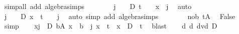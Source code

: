 \begin{isabellebody}
\ {\isacharparenleft}{\kern0pt}simp{\isacharunderscore}{\kern0pt}all\ add{\isacharcolon}{\kern0pt}\ algebra{\isacharunderscore}{\kern0pt}simps{\isacharparenright}{\kern0pt}\isanewline
\ \ \ \ \ \ \isamarkupfalse%
\ {\isachardoublequoteopen}{\isasymexists}j\ {\isasymin}\ {\isacharbraceleft}{\kern0pt}{}\ {\isachardot}{\kern0pt}{\isachardot}{\kern0pt}\ D{\isacharbraceright}{\kern0pt}{\isachardot}{\kern0pt}\ {\isacharparenleft}{\kern0pt}t\ {\isacharplus}{\kern0pt}\ {}{\isacharparenright}{\kern0pt}\ {\isacharminus}{\kern0pt}\ x\ {\isacharequal}{\kern0pt}\ j{\isachardoublequoteclose}\ \isamarkupfalse%
\ auto\isanewline
\ \ \ \ \ \ \isamarkupfalse%
\ {\isachardoublequoteopen}{\isasymexists}j\ {\isasymin}\ {\isacharbraceleft}{\kern0pt}{}\ {\isachardot}{\kern0pt}{\isachardot}{\kern0pt}\ D{\isacharbraceright}{\kern0pt}{\isachardot}{\kern0pt}\ x\ {\isacharequal}{\kern0pt}\ {\isacharparenleft}{\kern0pt}t\ {\isacharplus}{\kern0pt}\ {}{\isacharparenright}{\kern0pt}\ {\isacharminus}{\kern0pt}\ j{\isachardoublequoteclose}\ \isamarkupfalse%
\ {\isacharparenleft}{\kern0pt}auto\ simp\ add{\isacharcolon}{\kern0pt}\ algebra{\isacharunderscore}{\kern0pt}simps{\isacharparenright}{\kern0pt}\isanewline
\ \ \ \ \ \ \isamarkupfalse%
\ nob\ tA\ \isamarkupfalse%
\ {\isachardoublequoteopen}False{\isachardoublequoteclose}\ \isamarkupfalse%
\ simp\isacommand{{\isacharbraceright}{\kern0pt}}\isamarkupfalse%
\isanewline
\ \ \isamarkupfalse%
\ {\isachardoublequoteopen}{\isasymforall}x{\isachardot}{\kern0pt}{\isacharparenleft}{\kern0pt}{\isasymforall}j{\isasymin}{\isacharbraceleft}{\kern0pt}{}\ {\isachardot}{\kern0pt}{\isachardot}{\kern0pt}\ D{\isacharbraceright}{\kern0pt}{\isachardot}{\kern0pt}\ {\isasymforall}b{\isasymin}A{\isachardot}{\kern0pt}\ x\ {\isasymnoteq}\ b\ {\isacharminus}{\kern0pt}\ j{\isacharparenright}{\kern0pt}{\isasymlongrightarrow}\ {\isacharparenleft}{\kern0pt}x\ {\isasymle}\ t{\isacharparenright}{\kern0pt}\ {\isasymlongrightarrow}\ {\isacharparenleft}{\kern0pt}x\ {\isacharplus}{\kern0pt}\ D\ {\isasymle}\ t{\isacharparenright}{\kern0pt}{\isachardoublequoteclose}\ \isamarkupfalse%
\ blast\isanewline
{}\isamarkupfalse%
\isanewline
\ \ \isamarkupfalse%
\ d{\isacharcolon}{\kern0pt}\ {\isachardoublequoteopen}d\ dvd\ D{\isachardoublequoteclose}\isanewline
\ \ \isacommand{{\isacharbraceleft}{\kern0pt}}\isamarkupfalse%
\isamarkupfalse%

\end{isabellebody}
